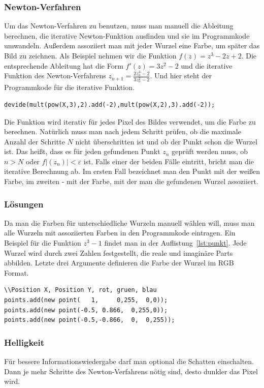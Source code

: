\documentclass[a4paper,12pt]{llncs}
\numberwithin{equation}{section}
\begin{document}
\subsubsection{Newton-Verfahren}
Um das Newton-Verfahren zu benutzen, muss man manuell die Ableitung berechnen, die iterative Newton-Funktion ausfinden und sie im Programmkode umwandeln.
Außerdem assoziiert man mit jeder Wurzel eine Farbe, um später das Bild zu zeichnen.
Als Beispiel nehmen wir die Funktion $f(z) = z^3 - 2z + 2$.
Die entsprechende Ableitung hat die Form $f'(z) = 3z^2 - 2$ und die iterative Funktion des Newton-Verfahrens $z_{n+1} = \frac{2z_n^3 - 2}{3z_n^2 - 2}$.
Und hier steht der Programmkode für die iterative Funktion.
\begin{lstlisting}
devide(mult(pow(X,3),2).add(-2),mult(pow(X,2),3).add(-2));
\end{lstlisting}
Die Funktion wird iterativ für jedes Pixel des Bildes verwendet, um die Farbe zu berechnen.
Natürlich muss man nach jedem Schritt prüfen, ob die maximale Anzahl der Schritte $N$ nicht überschritten ist und ob der Punkt schon die Wurzel ist. 
Das heißt, dass es für jeden gefundenen Punkt $z_n$ geprüft werden muss, ob $n > N$ oder $f|(z_n)| < \varepsilon$ ist.
Falls einer der beiden Fälle eintritt, bricht man die iterative Berechnung ab.
Im ersten Fall bezeichnet man den Punkt mit der weißen Farbe, im zweiten - mit der Farbe, mit der man die gefundenen Wurzel assoziiert. 

\subsubsection{Lösungen} 
Da man die Farben für unterschiedliche Wurzeln manuell wählen will, muss man alle Wurzeln mit assoziierten Farben in den Programmkode eintragen. 
Ein Beispiel für die Funktion $z^3 - 1$ findet man in der Auflistung~\ref{lst:punkt}. 
Jede Wurzel wird durch zwei Zahlen festgestellt, die reale und imaginäre Parts abbilden.
Letzte drei Argumente definieren die Farbe der Wurzel im RGB Format.
\begin{lstlisting}[caption=Wurzeln mit Farben für $z^3 - 1$, label=lst:punkt,captionpos=b]
\\Position X, Position Y, rot, gruen, blau
points.add(new point(   1,     0,255,  0,0)); 
points.add(new point(-0.5, 0.866,  0,255,0));
points.add(new point(-0.5,-0.866,  0,  0,255));
\end{lstlisting}

\subsubsection{Helligkeit}
Für bessere Informationswiedergabe darf man optional die Schatten einschalten.
Dann je mehr Schritte des Newton-Verfahrens nötig sind, desto dunkler das Pixel wird.  
\end{document}
